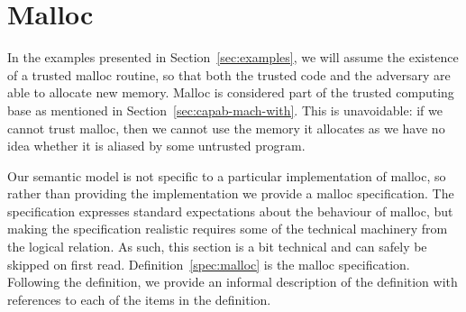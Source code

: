 \documentclass[format=acmsmall, review=true, screen=true]{acmart}
\renewcommand{\sectionname}{Section}
\newenvironment{toplas}%
    {\color{OliveGreen}}{}
\begin{document}
\begin{toplas}
  \section{Malloc}
  \label{sec:malloc}
  In the examples presented in \sectionname~\ref{sec:examples}, we will assume the existence of a trusted malloc routine, so that both the trusted code and the adversary are able to allocate new memory.
  Malloc is considered part of the trusted computing base as mentioned in \sectionname~\ref{sec:capab-mach-with}.
  This is unavoidable: if we cannot trust malloc, then we cannot use the memory it allocates as we have no idea whether it is aliased by some untrusted program.

  Our semantic model is not specific to a particular implementation of malloc, so rather than providing the implementation we provide a malloc specification.
  The specification expresses standard expectations about the behaviour of malloc, but making the specification realistic requires some of the technical machinery from the logical relation.
  As such, this section is a bit technical and can safely be skipped on first read.
  Definition~\ref{spec:malloc} is the malloc specification.
  Following the definition, we provide an informal description of the definition with references to each of the items in the definition.


\end{toplas}
\end{document}
